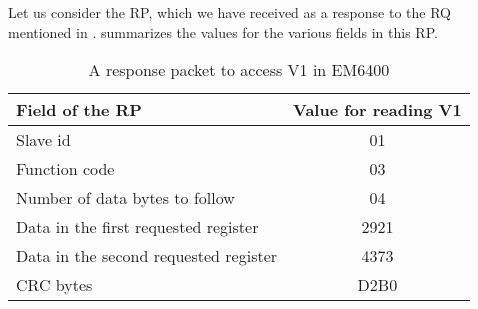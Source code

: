 Let us consider the RP, which we have received as a response to the RQ mentioned
in .  summarizes the values for the
various fields in this RP.
\begin{table}
  \centering
  \caption{A response packet to access V1 in EM6400}
  \label{tab:params-rp}
  \begin{tabular}{lc}\hline
    Field of the RP                       & Value for reading V1 \\ \hline
    Slave id                              & 01                   \\
    Function code                         & 03                   \\
    Number of data bytes to follow        & 04                   \\
    Data in the first requested register  & 2921                 \\
    Data in the second requested register & 4373                 \\
    CRC bytes                             & D2B0                 \\
    \hline
  \end{tabular}
\end{table}
